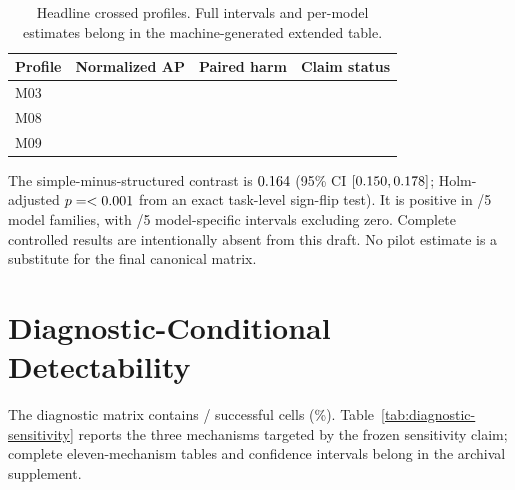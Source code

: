 \documentclass[letterpaper]{article}
\begin{document}
\begin{table}[t]
\centering
\small
\begin{tabular}{lrrr}
\toprule
Profile & Normalized AP & Paired harm & Claim status \\
\midrule
M03 & \LBMThreeDetectability{} & \LBMThreeHarm{} & \LBMThreeStatus{} \\
M08 & \LBMEightDetectability{} & \LBMEightHarm{} & \LBMEightStatus{} \\
M09 & \LBMNineDetectability{} & \LBMNineHarm{} & \LBMNineStatus{} \\
\bottomrule
\end{tabular}
\caption{Headline crossed profiles.  Full intervals and per-model estimates
belong in the machine-generated extended table.}
\label{tab:headline-profiles}
\end{table}

The simple-minus-structured contrast is
$0.164$ (95\% CI
$[0.150,0.178]$; Holm-adjusted
$p=<0.001$ from an exact task-level sign-flip test).  It is positive in
\LBModelPositiveDirectionCount{}/5 model families, with
\LBModelCIExcludesZeroCount{}/5 model-specific intervals excluding zero.
\else
Complete controlled results are intentionally absent from this draft.  No
pilot estimate is a substitute for the final canonical matrix.
\fi

\section{Diagnostic-Conditional Detectability}
\ifLBResultsReady
The diagnostic matrix contains \LBSuccessfulDiagnosticCells{}/
\LBExpectedDiagnosticCells{} successful cells
(\LBDiagnosticCompletionRate\%).  Table~\ref{tab:diagnostic-sensitivity} reports
the three mechanisms targeted by the frozen sensitivity claim; complete
eleven-mechanism tables and confidence intervals belong in the archival
supplement.
\end{document}
